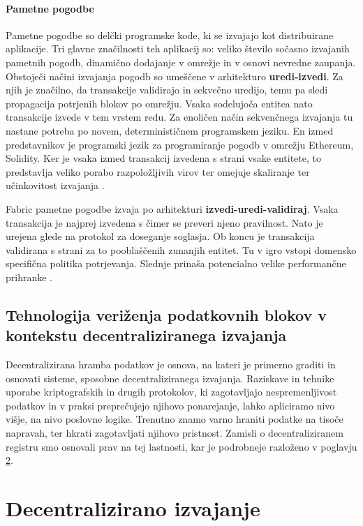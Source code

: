 \documentclass[a4paper, 12pt]{book}
\begin{document}
\subsubsection{Pametne pogodbe}
Pametne pogodbe so delčki programske kode, ki se izvajajo kot distribuirane aplikacije.
Tri glavne značilnosti teh aplikacij so: veliko število sočasno izvajanih pametnih pogodb, dinamično dodajanje v omrežje in v osnovi nevredne zaupanja.
Obstoječi načini izvajanja pogodb so umeščene v arhitekturo \textbf{uredi-izvedi}.
Za njih je značilno, da transakcije validirajo in sekvečno uredijo, temu pa sledi propagacija potrjenih blokov po omrežju.
Vsaka sodelujoča entitea nato transakcije izvede v tem vrstem redu.
Za enoličen način sekvenčnega izvajanja tu nastane potreba po novem, determinističnem programskem jeziku.
En izmed predstavnikov je programski jezik za programiranje pogodb v omrežju Ethereum, Solidity.
Ker je vsaka izmed transakcij izvedena s strani vsake entitete, to predstavlja veliko porabo razpoložljivih virov ter omejuje skaliranje ter učinkovitost izvajanja \cite{hyperledgerDocs}.

Fabric pametne pogodbe izvaja po arhitekturi \textbf{izvedi-uredi-validiraj}.
Vsaka transakcija je najprej izvedena s čimer se preveri njeno pravilnost.
Nato je urejena glede na protokol za doseganje soglasja.
Ob koncu je transakcija validirana s strani za to pooblaščenih zunanjih entitet.
Tu v igro vstopi domensko specifična politika potrjevanja.
Slednje prinaša potencialno velike performančne prihranke \cite{hyperledgerDocs}.

\section{Tehnologija veriženja podatkovnih blokov v kontekstu decentraliziranega izvajanja}
Decentralizirana hramba podatkov je osnova, na kateri je primerno graditi in osnovati sisteme, sposobne decentraliziranega izvajanja.
Raziskave in tehnike uporabe kriptografskih in drugih protokolov, ki zagotavljajo nespremenljivost podatkov in v praksi preprečujejo njihovo ponarejanje, lahko apliciramo nivo višje, na nivo poslovne logike.
Trenutno znamo varno hraniti podatke na tisoče napravah, ter hkrati zagotavljati njihovo pristnost.
Zamisli o decentraliziranem registru smo osnovali prav na tej lastnosti, kar je podrobneje razloženo v poglavju \ref{ch4}.

\chapter{Decentralizirano izvajanje}
\label{ch4}
\end{document}
